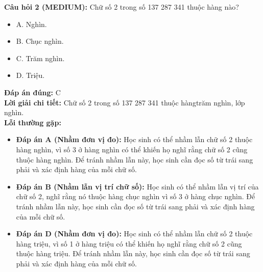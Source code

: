 \documentclass{article}
\begin{document}
\begin{minipage}{\textwidth}
\noindent\textbf{Câu hỏi 2 (MEDIUM):} Chữ số 2 trong số 137 287 341 thuộc hàng nào? 
\begin{itemize}[label={}]
    \item A. Nghìn.
    \item B. Chục nghìn.
    \item C. Trăm nghìn.
    \item D. Triệu.
\end{itemize}
\textbf{Đáp án đúng:} C \\
\textbf{Lời giải chi tiết:} Chữ số 2 trong số 137 287 341 thuộc hàngtrăm nghìn, lớp nghìn. \\
\textbf{Lỗi thường gặp:}
\begin{itemize}
  \item \textbf{Đáp án A (Nhầm đơn vị đo):} Học sinh có thể nhầm lẫn chữ số 2 thuộc hàng nghìn, vì số 3 ở hàng nghìn có thể khiến họ nghĩ rằng chữ số 2 cũng thuộc hàng nghìn. Để tránh nhầm lẫn này, học sinh cần đọc số từ trái sang phải và xác định hàng của mỗi chữ số.
  \item \textbf{Đáp án B (Nhầm lẫn vị trí chữ số):} Học sinh có thể nhầm lẫn vị trí của chữ số 2, nghĩ rằng nó thuộc hàng chục nghìn vì số 3 ở hàng chục nghìn. Để tránh nhầm lẫn này, học sinh cần đọc số từ trái sang phải và xác định hàng của mỗi chữ số.
  \item \textbf{Đáp án D (Nhầm đơn vị đo):} Học sinh có thể nhầm lẫn chữ số 2 thuộc hàng triệu, vì số 1 ở hàng triệu có thể khiến họ nghĩ rằng chữ số 2 cũng thuộc hàng triệu. Để tránh nhầm lẫn này, học sinh cần đọc số từ trái sang phải và xác định hàng của mỗi chữ số.
\end{itemize}
\end{minipage}
\vspace{1em}
\end{document}

